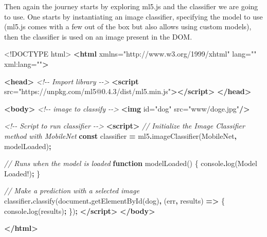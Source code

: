 \documentclass[
]{krantz}
\makeatletter
\newenvironment{Shaded}{\begin{snugshade}}{\end{snugshade}}
\newcommand{\BuiltInTok}[1]{#1}
\newcommand{\CommentTok}[1]{\textcolor[rgb]{0.37,0.37,0.37}{\textit{#1}}}
\newcommand{\DataTypeTok}[1]{\textcolor[rgb]{0.27,0.27,0.27}{#1}}
\newcommand{\FunctionTok}[1]{\textcolor[rgb]{0,0,0}{#1}}
\newcommand{\KeywordTok}[1]{\textcolor[rgb]{0.27,0.27,0.27}{\textbf{#1}}}
\newcommand{\NormalTok}[1]{#1}
\newcommand{\OperatorTok}[1]{\textcolor[rgb]{0.43,0.43,0.43}{\textbf{#1}}}
\newcommand{\OtherTok}[1]{\textcolor[rgb]{0.37,0.37,0.37}{#1}}
\newcommand{\StringTok}[1]{\textcolor[rgb]{0.5,0.5,0.5}{#1}}
\newenvironment{kframe}{%
\medskip{}
\setlength{\fboxsep}{.8em}
 \def\at@end@of@kframe{}%
 \ifinner\ifhmode%
  \def\at@end@of@kframe{\end{minipage}}%
  \begin{minipage}{\columnwidth}%
 \fi\fi%
 \def\FrameCommand##1{\hskip\@totalleftmargin \hskip-\fboxsep
 \colorbox{shadecolor}{##1}\hskip-\fboxsep
     \hskip-\linewidth \hskip-\@totalleftmargin \hskip\columnwidth}%
 \MakeFramed {\advance\hsize-\width
   \@totalleftmargin\z@ \linewidth\hsize
   \@setminipage}}%
 {\par\unskip\endMakeFramed%
 \at@end@of@kframe}
\renewenvironment{Shaded}{\begin{kframe}}{\end{kframe}}
\makeatother
\begin{document}
Then again the journey starts by exploring ml5.js and the classifier we are going to use. One starts by instantiating an image classifier, specifying the model to use (ml5.js comes with a few out of the box but also allows using custom models), then the classifier is used on an image present in the DOM.

\begin{Shaded}
\begin{Highlighting}[]
\DataTypeTok{\textless{}!DOCTYPE }\NormalTok{html}\DataTypeTok{\textgreater{}}
\KeywordTok{\textless{}html}\OtherTok{ xmlns=}\StringTok{"http://www.w3.org/1999/xhtml"}\OtherTok{ lang=}\StringTok{""}\OtherTok{ xml:lang=}\StringTok{""}\KeywordTok{\textgreater{}}

\KeywordTok{\textless{}head\textgreater{}}
  \CommentTok{\textless{}!{-}{-} Import library {-}{-}\textgreater{}}
  \KeywordTok{\textless{}script}\OtherTok{ src=}\StringTok{"https://unpkg.com/ml5@0.4.3/dist/ml5.min.js"}\KeywordTok{\textgreater{}\textless{}/script\textgreater{}}
\KeywordTok{\textless{}/head\textgreater{}}

\KeywordTok{\textless{}body\textgreater{}}
  \CommentTok{\textless{}!{-}{-} image to classify {-}{-}\textgreater{}}
  \KeywordTok{\textless{}img}\OtherTok{ id=}\StringTok{"dog"}\OtherTok{ src=}\StringTok{"www/doge.jpg"}\KeywordTok{/\textgreater{}}

  \CommentTok{\textless{}!{-}{-} Script to run classifier {-}{-}\textgreater{}}
  \KeywordTok{\textless{}script\textgreater{}}
    \CommentTok{// Initialize the Image Classifier method with MobileNet}
    \KeywordTok{const}\NormalTok{ classifier }\OperatorTok{=}\NormalTok{ ml5}\OperatorTok{.}\FunctionTok{imageClassifier}\NormalTok{(}\StringTok{\textquotesingle{}MobileNet\textquotesingle{}}\OperatorTok{,}\NormalTok{ modelLoaded)}\OperatorTok{;}

    \CommentTok{// Runs when the model is loaded}
    \KeywordTok{function} \FunctionTok{modelLoaded}\NormalTok{() \{}
      \BuiltInTok{console}\OperatorTok{.}\FunctionTok{log}\NormalTok{(}\StringTok{\textquotesingle{}Model Loaded!\textquotesingle{}}\NormalTok{)}\OperatorTok{;}
\NormalTok{    \}}

    \CommentTok{// Make a prediction with a selected image}
\NormalTok{    classifier}\OperatorTok{.}\FunctionTok{classify}\NormalTok{(}\BuiltInTok{document}\OperatorTok{.}\FunctionTok{getElementById}\NormalTok{(}\StringTok{\textquotesingle{}dog\textquotesingle{}}\NormalTok{)}\OperatorTok{,}\NormalTok{ (err}\OperatorTok{,}\NormalTok{ results) }\KeywordTok{=\textgreater{}}\NormalTok{ \{}
      \BuiltInTok{console}\OperatorTok{.}\FunctionTok{log}\NormalTok{(results)}\OperatorTok{;}
\NormalTok{    \})}\OperatorTok{;}
  \KeywordTok{\textless{}/script\textgreater{}}
\KeywordTok{\textless{}/body\textgreater{}}

\KeywordTok{\textless{}/html\textgreater{}}
\end{Highlighting}
\end{Shaded}
\end{document}
